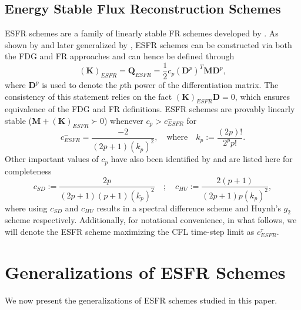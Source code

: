 \documentclass[preprint,12pt]{elsarticle}
\begin{document}
\subsection{Energy Stable Flux Reconstruction Schemes}
ESFR schemes are a family of linearly stable FR schemes developed by \cite{vincent2011new}. As shown by \cite{allaneau2011connections} and later generalized by \cite{zwanenburg2016equivalence}, ESFR schemes can be constructed via both the FDG and FR approaches and can hence be defined through
\begin{equation}
    (\mathbf{K})_{ESFR} = \mathbf{Q}_{ESFR} = \frac{1}{2} c_p(\mathbf{D}^p)^T \mathbf{M} \mathbf{D}^p,
    \label{eq:ESFR_definition}
\end{equation}
where $\mathbf{D}^p$ is used to denote the $p$th power of the differentiation matrix. The consistency of this statement relies on the fact $(\mathbf{K})_{ESFR}\mathbf{D}=0$, which ensures equivalence of the FDG and FR definitions. ESFR schemes are provably linearly stable ($\mathbf{M} + (\mathbf{K})_{ESFR} \succ 0$) whenever $c_p > c^{-}_{ESFR}$ for
\begin{equation}
    c_{ESFR}^{-} = \frac{-2}{(2p+1)(k_p)^2}, \quad
    \text{where} \quad
    k_p := \frac{(2p)!}{2^p p!}.
\end{equation}
Other important values of $c_p$ have also been identified by \cite{vincent2011new} and are listed here for completeness
\begin{equation}
    c_{SD} := \frac{2p}{(2p+1)(p+1)(k_p)^2}
    \quad ; \quad
    c_{HU} := \frac{2(p+1)}{(2p+1)p(k_p)^2},
    \label{eq:ch2_c_values}
\end{equation}
where using $c_{SD}$ and $c_{HU}$ results in a spectral difference scheme and Huynh's $g_2$ scheme respectively. Additionally, for notational convenience, in what follows, we will denote the ESFR scheme maximizing the CFL time-step limit as $c_{ESFR}^{\tau}$.

\section{Generalizations of ESFR Schemes}
\label{sec:gen}
We now present the generalizations of ESFR schemes studied in this paper.
\end{document}
